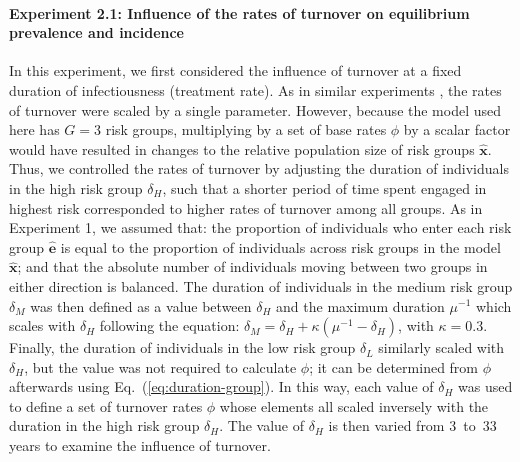 \paragraph{Experiment 2.1: Influence of the rates of turnover on equilibrium prevalence and incidence}
\label{p:exp-2-turnover-1}
In this experiment, we first considered the influence of turnover
at a fixed duration of infectiousness (treatment rate).
As in similar experiments \citep{Zhang2012,Henry2015},
the rates of turnover were scaled by a single parameter.
However, because the model used here has $G = 3$ risk groups,
multiplying by a set of base rates $\phi$ by a scalar factor
would have resulted in changes to the relative population size of risk groups $\bm{\hat{x}}$.
Thus, we controlled the rates of turnover by adjusting
the duration of individuals in the high risk group $\delta_H$,
such that a shorter period of time spent engaged in highest risk
corresponded to higher rates of turnover among all groups.
As in Experiment 1, we assumed that:
the proportion of individuals who enter each risk group $\bm{\hat{e}}$
is equal to
the proportion of individuals across risk groups in the model $\bm{\hat{x}}$;
and that the absolute number of individuals
moving between two groups in either direction is balanced.
The duration of individuals in the medium risk group $\delta_M$
was then defined as a value between $\delta_H$ and the maximum duration $\mu^{-1}$
which scales with $\delta_H$ following the equation:
$\delta_M = \delta_H + \kappa \left(\mu^{-1} - \delta_H\right)$, with $\kappa = 0.3$.
Finally, the duration of individuals in the low risk group $\delta_L$
similarly scaled with $\delta_H$,
but the value was not required to calculate $\phi$;
it can be determined from $\phi$ afterwards
using Eq.~(\ref{eq:duration-group}).
In this way, each value of $\delta_H$ was used to define a set of turnover rates $\phi$
whose elements all scaled inversely with the duration in the high risk group $\delta_H$.
The value of $\delta_H$ is then varied from 3~to~33 years to examine the influence of turnover.
